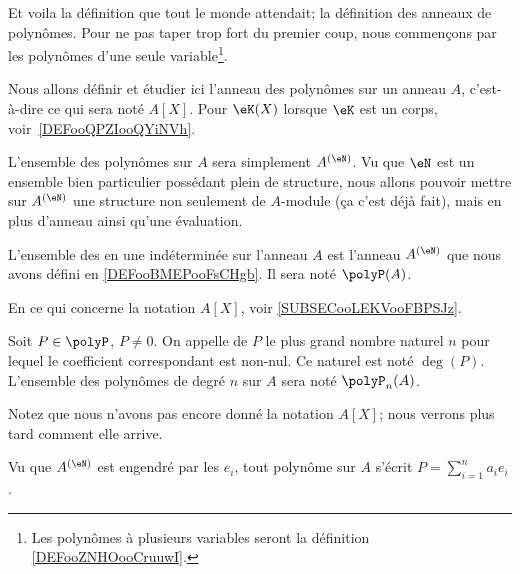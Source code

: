 Et voila la définition que tout le monde attendait; la définition des anneaux de polynômes. Pour ne pas taper trop fort du premier coup, nous commençons par les polynômes d'une seule variable\footnote{Les polynômes à plusieurs variables seront la définition \ref{DEFooZNHOooCruuwI}.}.

Nous allons définir et étudier ici l'anneau des polynômes sur un anneau \( A\), c'est-à-dire ce qui sera noté \( A[X]\). Pour \( \eK(X)\) lorsque \( \eK\) est un corps, voir~\ref{DEFooQPZIooQYiNVh}.

L'ensemble des polynômes sur \( A\) sera simplement \( A^{(\eN)}\). Vu que \( \eN\) est un ensemble bien particulier possédant plein de structure, nous allons pouvoir mettre sur \( A^{(\eN)}\) une structure non seulement de \( A\)-module (ça c'est déjà fait), mais en plus d'anneau ainsi qu'une évaluation.
\begin{definition}      \label{DEFooFYZRooMikwEL}
    L'ensemble des  en une indéterminée sur l'anneau \( A\) est l'anneau \( A^{(\eN)}\) que nous avons défini en \ref{DEFooBMEPooFsCHgb}. Il sera noté \( \polyP(A)\).

    En ce qui concerne la notation \( A[X]\), voir \ref{SUBSECooLEKVooFBPSJz}.
\end{definition}

\begin{definition}  \label{DefDegrePoly}
    Soit \( P \in \polyP\), \( P \neq 0 \). On appelle  de $P$ le plus grand nombre naturel $n$ pour lequel le coefficient correspondant est non-nul. Ce naturel est noté \( \deg(P) \). L'ensemble des polynômes de degré \( n\) sur \( A\) sera noté \( \polyP_n(A)\).
\end{definition}

Notez que nous n'avons pas encore donné la notation \( A[X]\); nous verrons plus tard comment elle arrive. 

Vu que \( A^{(\eN)}\) est engendré par les \( e_i\), tout polynôme sur \( A\) s'écrit \( P=\sum_{i=1}^na_ie_i\).

